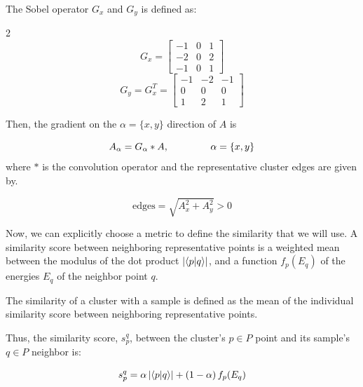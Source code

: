 \documentclass[a4paper,12pt]{report}
\begin{document}
\begin{appendices}
The Sobel operator $G_x$ and $G_y$ is defined as:

\begin{multicols}{2}
    \begin{equation}
        G_x = \left[
            \begin{array}{ccc}
                -1 & 0 & 1 \\
                -2 & 0 & 2 \\
                -1 & 0 & 1
            \end{array}
            \right]
    \end{equation}
    \begin{equation}
        G_y = G_x^T=\left[
            \begin{array}{ccc}
                -1 & -2 & -1 \\
                0  & 0  & 0  \\
                1  & 2  & 1
            \end{array}
            \right]
    \end{equation}
\end{multicols}

Then, the gradient on the $\alpha=\{x,y\}$ direction of $A$ is

\begin{equation}
    A_\alpha = G_\alpha \ast A,\hspace{1.5cm}\alpha=\{x,y\}
\end{equation}
where $\ast$ is the convolution operator and the representative cluster edges are given by.

\begin{equation}
    \text{edges} = \sqrt{A_x^2+A_y^2} > 0
\end{equation}

Now, we can explicitly choose a metric to define the similarity that we will use.
A similarity score between neighboring representative points is a weighted mean between the modulus of the dot product $\left|\braket{p}{q}\right|$, and a function $f_p(E_q)$ of the energies $E_q$ of the neighbor point $q$.

The similarity of a cluster with a sample is defined as the mean of the individual similarity score between neighboring representative points.

Thus, the similarity score, $s_p^q$, between the cluster's $p\in P$ point and its sample's $q \in P$ neighbor is:

\begin{equation}
    s_p^q = \alpha\left|\braket{p}{q}\right| + \left(1-\alpha\right)f_p(E_q)
\end{equation}


\end{appendices}
\end{document}
